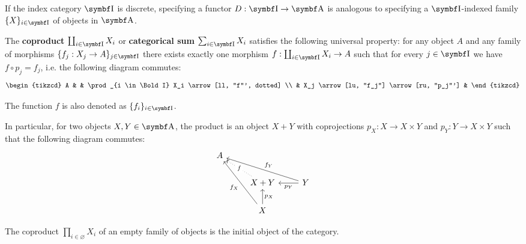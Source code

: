 \begin{definition}\label{def:categorical_coproduct}\cite[definition 5.2.2]{Leinster2014}
  If the index category \( \Bold I \) is discrete, specifying a functor \( D: \Bold I \to \Bold A \) is analogous to specifying a \( \Bold I \)-indexed family \( \{ X \}_{i \in \Bold I} \) of objects in \( \Bold A \).

  The \textbf{coproduct} \( \coprod_{i \in \Bold I} X_i \) or \textbf{categorical sum} \( \sum_{i \in \Bold I} X_i \) satisfies the following universal property: for any object \( A \) and any family of morphisms \( \{ f_j: {X_j} \to A \}_{j \in \Bold I} \) there exists exactly one morphism \( f: \coprod_{i \in \Bold I} X_i \to A \) such that for every \( j \in \Bold I \) we have \( f \circ p_j = f_j \), i.e. the following diagram commutes:
  \begin{equation*}
    \begin{tikzcd}
      A &                                          & \prod_{i \in \Bold I} X_i \arrow[ll, "f"', dotted] \\
        & X_j \arrow[lu, "f_j"] \arrow[ru, "p_j"'] &
    \end{tikzcd}
  \end{equation*}

  The function \( f \) is also denoted as \( \{ f_i \}_{i \in \Bold I} \).

  In particular, for two objects \( X, Y \in \Bold A \), the product is an object \( X + Y \) with coprojections \( p_X: X \to X \times Y \) and \( p_Y: Y \to X \times Y \) such that the following diagram commutes:
  \begin{equation*}
    \begin{tikzcd}
      A & & \\
        & X + Y \arrow[lu, "f" description, dotted] & Y \arrow[llu, "f_Y"'] \arrow[l, "p_Y"] \\
        & X \arrow[luu, "f_X"] \arrow[u, "p_X"']    &
    \end{tikzcd}
  \end{equation*}
\end{definition}

\begin{note}\label{note:empty_categorical_coproduct}
  The coproduct \( \prod_{i \in \varnothing} X_i \) of an empty family of objects is the initial object of the category.
\end{note}

